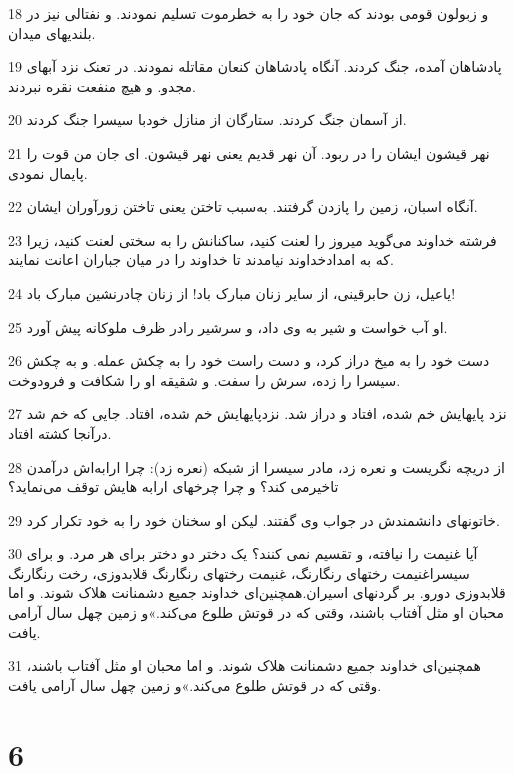 \par 18 و زبولون قومی بودند که جان خود را به خطرموت تسلیم نمودند. و نفتالی نیز در بلندیهای میدان.
\par 19 پادشاهان آمده، جنگ کردند. آنگاه پادشاهان کنعان مقاتله نمودند. در تعنک نزد آبهای مجدو. و هیچ منفعت نقره نبردند.
\par 20 از آسمان جنگ کردند. ستارگان از منازل خودبا سیسرا جنگ کردند.
\par 21 نهر قیشون ایشان را در ربود. آن نهر قدیم یعنی نهر قیشون. ای جان من قوت را پایمال نمودی.
\par 22 آنگاه اسبان، زمین را پازدن گرفتند. به‌سبب تاختن یعنی تاختن زورآوران ایشان.
\par 23 فرشته خداوند می‌گوید میروز را لعنت کنید، ساکنانش را به سختی لعنت کنید، زیرا که به امدادخداوند نیامدند تا خداوند را در میان جباران اعانت نمایند.
\par 24 یاعیل، زن حابرقینی، از سایر زنان مبارک باد! از زنان چادرنشین مبارک باد!
\par 25 او آب خواست و شیر به وی داد، و سرشیر رادر ظرف ملوکانه پیش آورد.
\par 26 دست خود را به میخ دراز کرد، و دست راست خود را به چکش عمله. و به چکش سیسرا را زده، سرش را سفت. و شقیقه او را شکافت و فرودوخت.
\par 27 نزد پایهایش خم شده، افتاد و دراز شد. نزدپایهایش خم شده، افتاد. جایی که خم شد درآنجا کشته افتاد.
\par 28 از دریچه نگریست و نعره زد، مادر سیسرا از شبکه (نعره زد): چرا ارابه‌اش در‌آمدن تاخیرمی کند؟ و چرا چرخهای ارابه هایش توقف می‌نماید؟
\par 29 خاتونهای دانشمندش در جواب وی گفتند. لیکن او سخنان خود را به خود تکرار کرد.
\par 30 آیا غنیمت را نیافته، و تقسیم نمی کنند؟ یک دختر دو دختر برای هر مرد. و برای سیسراغنیمت رختهای رنگارنگ، غنیمت رختهای رنگارنگ قلابدوزی، رخت رنگارنگ قلابدوزی دورو. بر گردنهای اسیران.همچنین‌ای خداوند جمیع دشمنانت هلاک شوند. و اما محبان او مثل آفتاب باشند، وقتی که در قوتش طلوع می‌کند.»و زمین چهل سال آرامی یافت.
\par 31 همچنین‌ای خداوند جمیع دشمنانت هلاک شوند. و اما محبان او مثل آفتاب باشند، وقتی که در قوتش طلوع می‌کند.»و زمین چهل سال آرامی یافت.
 
\chapter{6}

